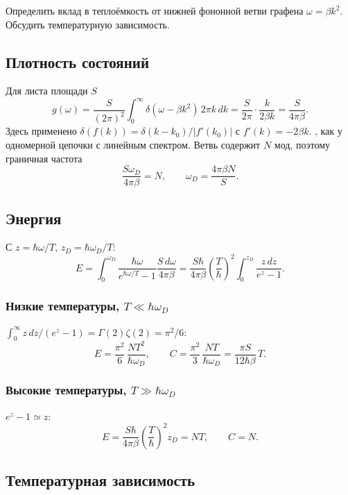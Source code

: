 \documentclass[../final.tex]{subfiles}
\begin{document}
\label{task:fksv_graphene}

\condition
Определить вклад в теплоёмкость от нижней фононной ветви графена
$\omega=\beta k^2$. Обсудить температурную зависимость.

\solution

\subsection*{Плотность состояний}

Для листа площади $S$
\[
    g(\omega)=\frac{S}{(2\pi)^2}\int_0^\infty
       \delta(\omega-\beta k^2)\,2\pi k\,dk
     =\frac S{2\pi}\cdot\frac{k}{2\beta k}
     =\frac S{4\pi\beta}.
\]
Здесь применено $\delta(f(k))=\delta(k-k_0)/|f'(k_0)|$
с $f'(k)=-2\beta k$.
, как у одномерной цепочки
с линейным спектром. Ветвь содержит $N$ мод, поэтому граничная частота
\[
    \frac{S\omega_D}{4\pi\beta}=N,\qquad
    \omega_D=\frac{4\pi\beta N}S.
\]

\subsection*{Энергия}

С $z=\hbar\omega/T$, $z_D=\hbar\omega_D/T$:
\[
    E=\int_0^{\omega_D}\frac{\hbar\omega}{e^{\hbar\omega/T}-1}
       \frac{S\,d\omega}{4\pi\beta}
     =\frac{S\hbar}{4\pi\beta}\left(\frac T\hbar\right)^2
       \int_0^{z_D}\frac{z\,dz}{e^z-1}.
\]

\subsubsection*{Низкие температуры, $T\ll\hbar\omega_D$}
$\int_0^\infty z\,dz/(e^z-1)=\Gamma(2)\zeta(2)=\pi^2/6$:
\[
    E=\frac{\pi^2}6\,\frac{NT^2}{\hbar\omega_D},\qquad
    C=\frac{\pi^2}3\,\frac{NT}{\hbar\omega_D}
     =\frac{\pi S}{12\hbar\beta}\,T.
\]

\subsubsection*{Высокие температуры, $T\gg\hbar\omega_D$}
$e^z-1\simeq z$:
\[
    E=\frac{S\hbar}{4\pi\beta}\left(\frac T\hbar\right)^2z_D=NT,
    \qquad C=N.
\]

\subsection*{Температурная зависимость}
\end{document}
